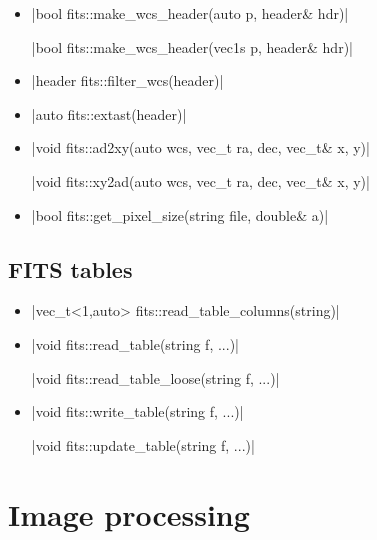 \documentclass[12pt]{report}
\begin{document}
\begin{itemize}
\item \cppinline|bool fits::make_wcs_header(auto p, header& hdr)| 

\cppinline|bool fits::make_wcs_header(vec1s p, header& hdr)|

\item \cppinline|header fits::filter_wcs(header)| 

\item \cppinline|auto fits::extast(header)| 

\item \cppinline|void fits::ad2xy(auto wcs, vec_t ra, dec, vec_t& x, y)| 

\cppinline|void fits::xy2ad(auto wcs, vec_t ra, dec, vec_t& x, y)| 

\item \cppinline|bool fits::get_pixel_size(string file, double& a)| 

\end{itemize}

\subsection{FITS tables}

\begin{itemize}
\item \cppinline|vec_t<1,auto> fits::read_table_columns(string)| 

\item \cppinline|void fits::read_table(string f, ...)| 

\cppinline|void fits::read_table_loose(string f, ...)| 

\item \cppinline|void fits::write_table(string f, ...)| 

\cppinline|void fits::update_table(string f, ...)| 

\end{itemize}


\section{Image processing \label{SEC:support:image}}
\end{document}
